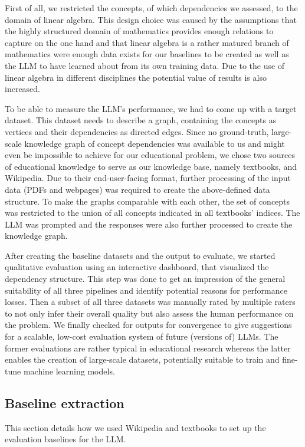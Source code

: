 \documentclass{article}
\begin{document}
First of all, we restricted the concepts, of which dependencies we assessed, to the domain of linear algebra. This design choice was caused by the assumptions that the highly structured domain of mathematics provides enough relations to capture on the one hand and that linear algebra is a rather matured branch of mathematics were enough data exists for our baselines to be created as well as the LLM to have learned about from its own training data. Due to the use of linear algebra in different disciplines the potential value of results is also increased.

To be able to measure the LLM's performance, we had to come up with a target dataset. This dataset needs to describe a graph, containing the concepts as vertices and their dependencies as directed edges. Since no ground-truth, large-scale knowledge graph of concept dependencies was available to us and might even be impossible to achieve for our educational problem, we chose two sources of educational knowledge to serve as our knowledge base, namely textbooks, and Wikipedia. Due to their end-user-facing format, further processing of the input data (PDFs and webpages) was required to create the above-defined data structure. To make the graphs comparable with each other, the set of concepts was restricted to the union of all concepts indicated in all textbooks' indices. The LLM was prompted and the responses were also further processed to create the knowledge graph.

After creating the baseline datasets and the output to evaluate, we started qualitative evaluation using an interactive dashboard, that visualized the dependency structure. This step was done to get an impression of the general suitability of all three pipelines and identify potential reasons for performance losses. Then a subset of all three datasets was manually rated by multiple raters to not only infer their overall quality but also assess the human performance on the problem. We finally checked for outputs for convergence to give suggestions for a scalable, low-cost evaluation system of future (versions of) LLMs. The former evaluations are rather typical in educational research whereas the latter enables the creation of large-scale datasets, potentially suitable to train and fine-tune machine learning models.

\subsection{Baseline extraction}
This section details how we used Wikipedia and textbooks to set up the evaluation baselines for the LLM.
\end{document}
